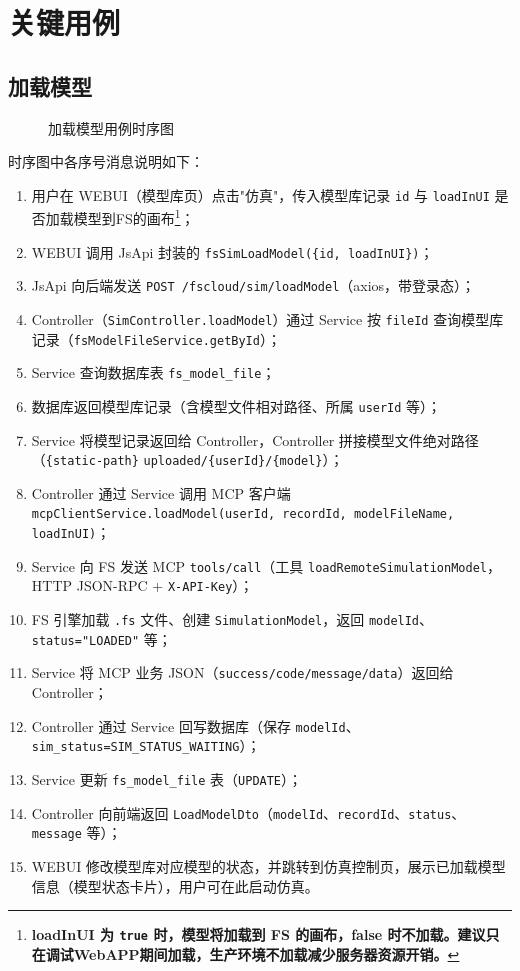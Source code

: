 \section{关键用例}
\subsection{加载模型}
\begin{figure}[!h]
	\centering
	\resizebox{1.0\linewidth}{!}{}
	\caption{加载模型用例时序图}\label{fig:loadModel}
\end{figure}
时序图中各序号消息说明如下：
\begin{enumerate}[label=\arabic*)]
	\item 用户在 WEBUI（模型库页）点击"仿真"，传入模型库记录 \texttt{id} 与 \texttt{loadInUI} 是否加载模型到FS的画布\footnote{\bf{loadInUI} 为 \texttt{true} 时，模型将加载到 FS 的画布，false 时不加载。建议只在调试WebAPP期间加载，生产环境不加载减少服务器资源开销。}；
	\item WEBUI 调用 JsApi 封装的 \texttt{fsSimLoadModel(\{id, loadInUI\})}；
	\item JsApi 向后端发送 \texttt{POST /fscloud/sim/loadModel}（axios，带登录态）；
	\item Controller（\texttt{SimController.loadModel}）通过 Service 按 \texttt{fileId} 查询模型库记录（\texttt{fsModelFileService.getById}）；
	\item Service 查询数据库表 \texttt{fs\_model\_file}；
	\item 数据库返回模型库记录（含模型文件相对路径、所属 \texttt{userId} 等）；
	\item Service 将模型记录返回给 Controller，Controller 拼接模型文件绝对路径（\texttt{\{static-path\}} \texttt{uploaded/\{userId\}/\{model\}}）；
	\item Controller 通过 Service 调用 MCP 客户端 \texttt{mcpClientService.loadModel(userId, recordId, modelFileName, loadInUI)}；
	\item Service 向 FS 发送 MCP \texttt{tools/call}（工具 \texttt{loadRemoteSimulationModel}，HTTP JSON-RPC + \texttt{X-API-Key}）；
	\item FS 引擎加载 \texttt{.fs} 文件、创建 \texttt{SimulationModel}，返回 \texttt{modelId}、\texttt{status="LOADED"} 等；
	\item Service 将 MCP 业务 JSON（\texttt{success/code/message/data}）返回给 Controller；
	\item Controller 通过 Service 回写数据库（保存 \texttt{modelId}、\texttt{sim\_status=SIM\_STATUS\_WAITING}）；
	\item Service 更新 \texttt{fs\_model\_file} 表（\texttt{UPDATE}）；
	\item Controller 向前端返回 \texttt{LoadModelDto}（\texttt{modelId}、\texttt{recordId}、\texttt{status}、\texttt{message} 等）；
	\item WEBUI 修改模型库对应模型的状态，并跳转到仿真控制页，展示已加载模型信息（模型状态卡片），用户可在此启动仿真。
\end{enumerate}
\newpage
